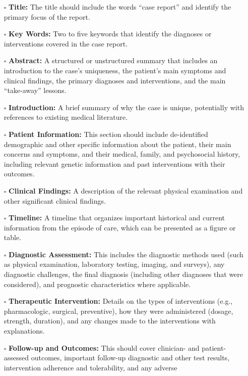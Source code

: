 \documentclass[11pt]{article}
\def\tightlist{}
\begin{document}
\begin{Form}
\begin{itemize}
\tightlist
\item[$\square$]
  \textbf{Title:} The title should include the words ``case report'' and
  identify the primary focus of the report.
\item[$\square$]
  \textbf{Key Words:} Two to five keywords that identify the diagnoses
  or interventions covered in the case report.
\item[$\square$]
  \textbf{Abstract:} A structured or unstructured summary that includes
  an introduction to the case's uniqueness, the patient's main symptoms
  and clinical findings, the primary diagnoses and interventions, and
  the main ``take-away'' lessons.
\item[$\square$]
  \textbf{Introduction:} A brief summary of why the case is unique,
  potentially with references to existing medical literature.
\item[$\square$]
  \textbf{Patient Information:} This section should include
  de-identified demographic and other specific information about the
  patient, their main concerns and symptoms, and their medical, family,
  and psychosocial history, including relevant genetic information and
  past interventions with their outcomes.
\item[$\square$]
  \textbf{Clinical Findings:} A description of the relevant physical
  examination and other significant clinical findings.
\item[$\square$]
  \textbf{Timeline:} A timeline that organizes important historical and
  current information from the episode of care, which can be presented
  as a figure or table.
\item[$\square$]
  \textbf{Diagnostic Assessment:} This includes the diagnostic methods
  used (such as physical examination, laboratory testing, imaging, and
  surveys), any diagnostic challenges, the final diagnosis (including
  other diagnoses that were considered), and prognostic characteristics
  where applicable.
\item[$\square$]
  \textbf{Therapeutic Intervention:} Details on the types of
  interventions (e.g., pharmacologic, surgical, preventive), how they
  were administered (dosage, strength, duration), and any changes made
  to the interventions with explanations.
\item[$\square$]
  \textbf{Follow-up and Outcomes:} This should cover clinician- and
  patient-assessed outcomes, important follow-up diagnostic and other
  test results, intervention adherence and tolerability, and any adverse

\end{itemize}
\end{Form}
\end{document}
